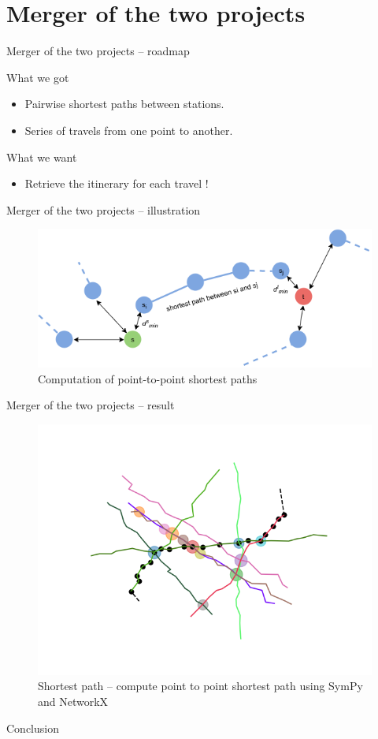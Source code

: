 \section{Merger of the two projects}

\begin{frame}{Merger of the two projects -- roadmap}
	\begin{block}{What we got}
		\begin{itemize}
			\item Pairwise shortest paths between stations.
			\item Series of travels from one point to another.
		\end{itemize}
	\end{block}
	\begin{alertblock}{What we want}
		\begin{itemize}
			\item Retrieve the itinerary for each travel !
		\end{itemize}
	\end{alertblock}
\end{frame}

\begin{frame}{Merger of the two projects -- illustration}
	\begin{figure}
		\centering
		\includegraphics[width=\linewidth]{images/shortest_path.png}
		\caption{Computation of point-to-point shortest paths}
	\end{figure}
\end{frame}
\begin{frame}{Merger of the two projects -- result}
	\begin{figure}
		\centering
		\includegraphics[width=0.7\linewidth]{images/net_8.png}
		\caption{Shortest path -- compute point to point shortest path using SymPy and NetworkX}
	\end{figure}
\end{frame}
\begin{frame}{Conclusion}
	
\end{frame}